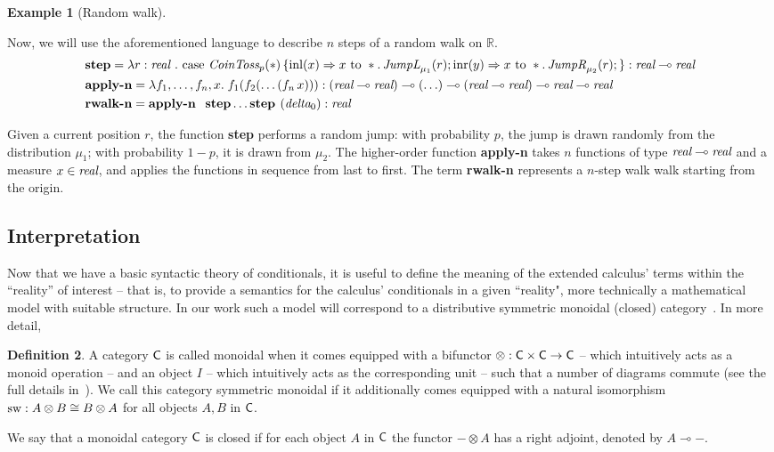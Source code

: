 \documentclass[10pt,a4paper]{amsart}
\theoremstyle{definition}
\newtheorem{definition}{Definition}[section]
\theoremstyle{definition}
\newtheorem{example}[definition]{Example}
\theoremstyle{definition}
\theoremstyle{definition}
\theoremstyle{definition}
\theoremstyle{definition}
\begin{document}
\begin{example}[Random walk] \label{ex:random_walk_prob}

Now, we will use the aforementioned language to describe $n$ steps of a random walk on $\mathbb{R}$.
\begin{align*}
  &\textbf{step} =  \lambda r: \emph{real } .\
  \text{case } \emph{CoinToss}_p(*) \,
  \{\mathrm{inl}(x) \Rightarrow x \text{ to } \ast.\, \emph{JumpL}_{\mu_1}(r) 
  ; \mathrm{inr}(y) \Rightarrow x \text{ to } \ast.\, \emph{JumpR}_{\mu_2}(r);\}
  : \textit{real} \multimap \textit{real}   \\
  & \textbf{apply-n} = \lambda f_1, \dots, f_n, x.\; f_1(f_2(\dots(f_n\,x))): (\emph{real} \multimap \emph{real}) \multimap (\ldots ) \multimap (\emph{real} \multimap \emph{real}) \multimap \emph{real} \multimap \emph{real} \\
  & \textbf{rwalk-n} = \textbf{apply-n } \textbf{ step} \ldots \textbf{step } (\emph{delta}_0) : \emph{real}
\end{align*}


Given a current position $r$, the function \textbf{step} performs a random jump: with probability $p$, the jump is drawn randomly from the distribution \( \mu_1 \); with probability $1-p$, it is drawn from $\mu_2$.
The higher-order function \textbf{apply-n} takes $ n $  functions of type \( \emph{real} \multimap \emph{real} \) and a measure \( x \in \emph{real} \), and applies the functions in sequence from last to first.
The term \textbf{rwalk-n} represents a $n$-step walk  walk starting from the origin.


\end{example}
 


 \subsection{Interpretation}

Now that we have a basic syntactic theory of conditionals, it is useful to
define the meaning of the extended calculus' terms within the ``reality'' of
interest -- that is, to provide a semantics for the calculus' conditionals in a
given ``reality", more technically a mathematical model with suitable
structure. In our work such a model will correspond to a distributive symmetric
monoidal (closed) category~\cite{maclane13}. In more detail, 
\begin{definition}
        A category $\mathsf{C}$ is called monoidal when it comes equipped with a
        bifunctor $\otimes: \mathsf{C} \times \mathsf{C} \to \mathsf{C}$ -- which intuitively
        acts as a monoid operation -- and an object $I$ -- which intuitively
        acts as the corresponding unit -- such that a number of diagrams
        commute (see the full details in~\cite{maclane13}). We call this
        category symmetric monoidal if it additionally comes equipped with a
        natural isomorphism $\mathrm{sw} : A \otimes B \cong B \otimes A$ for all
        objects $A,B$ in $\mathsf{C}$.

        We say that a monoidal category $\mathsf{C}$ is closed if for each object
        $A$ in $\mathsf{C}$ the functor $- \otimes A$ has a right adjoint,
        denoted by $A \multimap -$. 
\end{definition}
\end{document}
